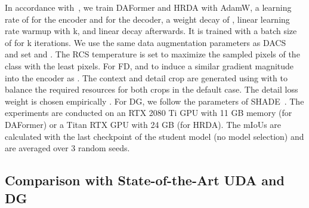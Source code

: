 \documentclass[journal,compsoc]{IEEEtran}
\begin{document}
In accordance with~\cite{xie2021segformer}, we train DAFormer and HRDA with AdamW, a learning rate of  for the encoder and  for the decoder, a weight decay of , linear learning rate warmup with k, and linear decay afterwards. It is trained with a batch size of  for k iterations.
We use the same data augmentation parameters as DACS~\cite{tranheden2021dacs} and set  and .
The RCS temperature is set  to maximize the sampled pixels of the class with the least pixels.
For FD,  and  to induce a similar gradient magnitude into the encoder as .
The context and detail crop are generated using  with  to balance the required resources for both crops in the default case. The detail loss weight is chosen empirically . 
For DG, we follow the parameters of SHADE~\cite{zhao2022style}.
The experiments are conducted on an RTX 2080 Ti GPU with 11 GB memory (for DAFormer) or a Titan RTX GPU with 24 GB (for HRDA). The mIoUs are calculated with the last checkpoint of the student model  (no model selection) and are averaged over 3 random seeds.

\subsection{Comparison with State-of-the-Art UDA and DG}
\end{document}
